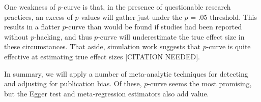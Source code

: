 \documentclass[man]{apa6}
\begin{document}
One weakness of $p$-curve is that, in the presence of questionable research practices, an excess of $p$-values will gather just under the $p$ = .05 threshold. This results in a flatter $p$-curve than would be found if studies had been reported without $p$-hacking, and thus $p$-curve will underestimate the true effect size in these circumstances. That aside, simulation work suggests that $p$-curve is quite effective at estimating true effect sizes [CITATION NEEDED].

In summary, we will apply a number of meta-analytic techniques for detecting and adjusting for publication bias. Of these, $p$-curve seems the most promising, but the Egger test and meta-regression estimators also add value.


%
%
\end{document}
